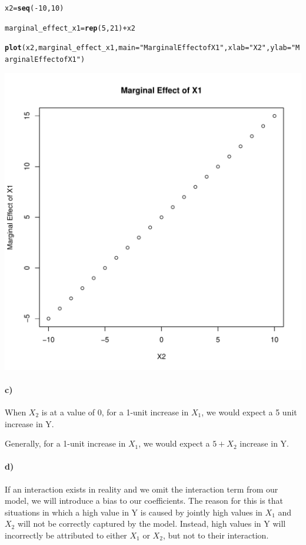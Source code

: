 \documentclass[12pt]{article}\usepackage[]{graphicx}\usepackage[]{color}
\makeatletter
\def\maxwidth{ %
  \ifdim\Gin@nat@width>\linewidth
    \linewidth
  \else
    \Gin@nat@width
  \fi
}
\newcommand{\hlnum}[1]{\textcolor[rgb]{0.686,0.059,0.569}{#1}}%
\newcommand{\hlstr}[1]{\textcolor[rgb]{0.192,0.494,0.8}{#1}}%
\newcommand{\hlopt}[1]{\textcolor[rgb]{0,0,0}{#1}}%
\newcommand{\hlstd}[1]{\textcolor[rgb]{0.345,0.345,0.345}{#1}}%
\newcommand{\hlkwb}[1]{\textcolor[rgb]{0.69,0.353,0.396}{#1}}%
\newcommand{\hlkwc}[1]{\textcolor[rgb]{0.333,0.667,0.333}{#1}}%
\newcommand{\hlkwd}[1]{\textcolor[rgb]{0.737,0.353,0.396}{\textbf{#1}}}%
\newenvironment{kframe}{%
 \def\at@end@of@kframe{}%
 \ifinner\ifhmode%
  \def\at@end@of@kframe{\end{minipage}}%
  \begin{minipage}{\columnwidth}%
 \fi\fi%
 \def\FrameCommand##1{\hskip\@totalleftmargin \hskip-\fboxsep
 \colorbox{shadecolor}{##1}\hskip-\fboxsep
     \hskip-\linewidth \hskip-\@totalleftmargin \hskip\columnwidth}%
 \MakeFramed {\advance\hsize-\width
   \@totalleftmargin\z@ \linewidth\hsize
   \@setminipage}}%
 {\par\unskip\endMakeFramed%
 \at@end@of@kframe}
\newenvironment{knitrout}{}{} %
\makeatother
\begin{document}
\begin{knitrout}
\color{fgcolor}\begin{kframe}
\begin{alltt}
\hlstd{x2} \hlkwb{=} \hlkwd{seq}\hlstd{(}\hlopt{-}\hlnum{10}\hlstd{,} \hlnum{10}\hlstd{)}

\hlstd{marginal_effect_x1} \hlkwb{=} \hlkwd{rep}\hlstd{(}\hlnum{5}\hlstd{,} \hlnum{21}\hlstd{)} \hlopt{+} \hlstd{x2}

\hlkwd{plot}\hlstd{(x2, marginal_effect_x1,} \hlkwc{main} \hlstd{=} \hlstr{"Marginal Effect of X1"}\hlstd{,} \hlkwc{xlab} \hlstd{=} \hlstr{"X2"}\hlstd{,} \hlkwc{ylab} \hlstd{=} \hlstr{"Marginal Effect of X1"}\hlstd{)}
\end{alltt}
\end{kframe}
\includegraphics[width=\maxwidth]{figure/unnamed-chunk-4-1} 

\end{knitrout}

\paragraph*{c)} When $X_2$ is at a value of 0, for a 1-unit increase in $X_1$, we would expect a 5 unit increase in Y.

Generally, for a 1-unit increase in $X_1$, we would expect a $5 + X_2$ increase in Y.

\paragraph*{d)}

If an interaction exists in reality and we omit the interaction term from our model, we will introduce a bias to our coefficients. The reason for this is that situations in which a high value in Y is caused by jointly high values in $X_1$ and $X_2$ will not be correctly captured by the model. Instead, high values in Y will incorrectly be attributed to either $X_1$ or $X_2$, but not to their interaction.
\end{document}
